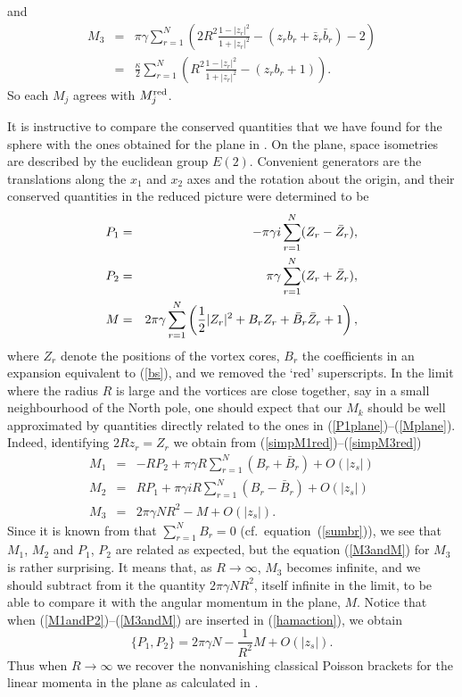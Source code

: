 \documentclass[a4paper,11pt]{article}
\begin{document}
and
\begin{eqnarray*}
M_{3}&=&{\pi \gamma}\sum_{r=1}^{N} \left(
2R^{2}\frac{1-|{z}_{r}|^{2}}{1+|z_{r}|^{2}}
-\left( z_{r}b_{r}+ \bar{z}_{r}\bar{b}_{r}\right) 
-2 \right)\\
&=&\frac{\kappa}{2}\sum_{r=1}^{N}\left(
R^{2}\frac{1-|z_{r}|^{2}}{1+|z_{r}|^{2}}-(z_{r}b_{r}+1)
\right). 
\end{eqnarray*}
So each $M_{j}$ agrees with $M_{j}^{\rm red}$.


It is instructive to compare the conserved quantities that we have found
for the sphere with the ones obtained for the plane in \cite{MNcl}.
On the plane, space isometries are described by the euclidean group
$E(2)$. Convenient generators are the translations
along the $x_{1}$ and $x_{2}$ axes and the rotation about the origin, and
their conserved quantities in the reduced picture were determined to be
\begin{eqnarray}
P_{1}&=&
-{\pi \gamma i}\sum_{r=1}^{N} 
(Z_{r}-\bar{Z}_{r}),\label{P1plane}\\
P_{2}&=&
\-{\pi \gamma}\sum_{r=1}^{N}(Z_{r}+\bar{Z}_{r}),\label{P2plane}\\
M&=&
\-2\pi\gamma\sum_{r=1}^{N}\left(\frac{1}{2}|Z_{r}|^{2}+B_{r}Z_{r}+
\bar{B}_{r}\bar{Z}_{r} +1 \right),\label{Mplane}
\end{eqnarray}
where $Z_{r}$ denote the positions of the vortex cores, $B_{r}$ the 
coefficients in an expansion equivalent to (\ref{bs}), and we removed
the `red' superscripts.
In the limit where the radius $R$ is large and the vortices are close
together, say in a small neighbourhood of the North pole, one should
expect that our $M_{k}$ should be well approximated by quantities 
directly related to the ones in (\ref{P1plane})--(\ref{Mplane}).
Indeed, identifying $2 R z_{r}=Z_{r}$ we obtain from 
(\ref{simpM1red})--(\ref{simpM3red})
\begin{eqnarray}
M_{1}&=&-RP_{2}+\pi\gamma R\sum_{r=1}^{N}(B_{r}+\bar{B}_{r})+O(|z_{s}|)  
\label {M1andP2} \\
M_{2}&=&RP_{1}+\pi\gamma iR\sum_{r=1}^{N}(B_{r}-\bar{B}_{r})+O(|z_{s}|)  
\label{M2andP1}\\
M_{3}&=&2\pi\gamma NR^{2}-M+O(|z_{s}|). \label{M3andM}
\end{eqnarray}
Since it is known from \cite{Sam} that $\sum_{r=1}^{N}B_{r}=0$
(cf.~equation~(\ref{sumbr})), we see
that $M_{1}$, $M_{2}$ and $P_{1}$, $P_{2}$ are related as 
expected, but the 
equation (\ref{M3andM}) for $M_{3}$ is rather surprising. It means that, as 
$R\rightarrow\infty$, 
$M_{3}$ becomes infinite, and we should subtract from it
the quantity $2\pi\gamma N R^{2}$, itself infinite in the limit, to be
able to compare it with the angular momentum in the plane, $M$.
Notice that when (\ref{M1andP2})--(\ref{M3andM}) are inserted in 
(\ref{hamaction}), we obtain
\[
\{P_{1},P_{2}\}=2\pi\gamma N-\frac{1}{R^{2}}M+O(|z_{s}|).
\]
Thus when $R\rightarrow \infty$ we recover the nonvanishing
classical Poisson brackets for the linear momenta in the plane
as calculated in \cite{Hor}.
\end{document}
